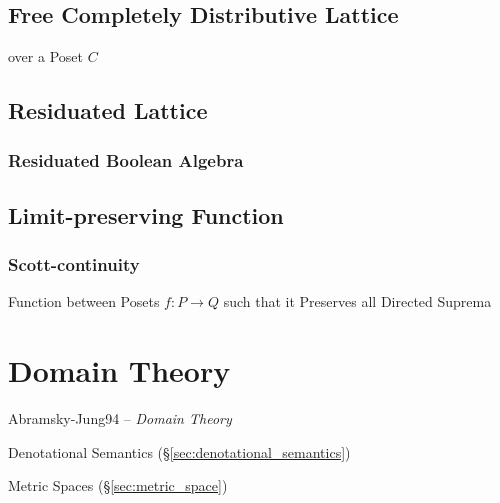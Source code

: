 \subsection{Free Completely Distributive Lattice}
\label{sec:free_completely_distributive_lattice}

over a Poset $C$



\subsection{Residuated Lattice}\label{sec:residuated_lattice}

\subsubsection{Residuated Boolean Algebra}
\label{sec:residuated_boolean_algebra}



\subsection{Limit-preserving Function}\label{sec:limit_preserving}

\subsubsection{Scott-continuity}\label{sec:scott_continuity}

Function between Posets $f : P \rightarrow Q$ such that it Preserves
all Directed Suprema %



\section{Domain Theory}\label{sec:domain_theory}


Abramsky-Jung94 -- \emph{Domain Theory}

Denotational Semantics (\S\ref{sec:denotational_semantics})

Metric Spaces (\S\ref{sec:metric_space})

